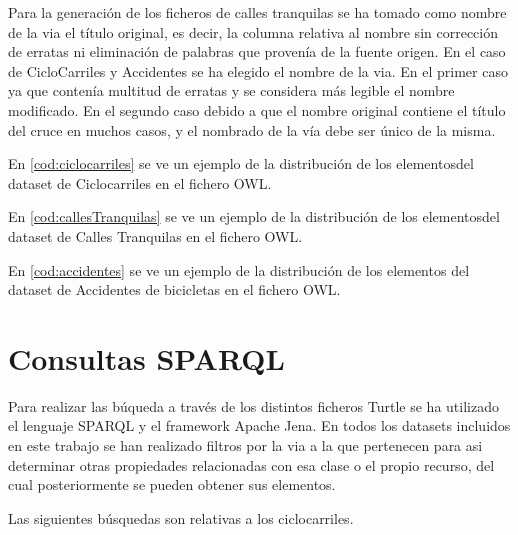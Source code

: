 Para la generación de los ficheros de calles tranquilas se ha tomado como nombre de la via el título original, es decir, la columna relativa al nombre sin corrección de erratas ni eliminación de palabras que provenía de la fuente origen. En el caso de CicloCarriles y Accidentes se ha elegido el nombre de la via. En el primer caso ya que contenía multitud de erratas y se considera más legible el nombre modificado. En el segundo caso debido a que el nombre original contiene el título del cruce en muchos casos, y el nombrado de la vía debe ser único de la misma.

En \ref{cod:ciclocarriles} se ve un ejemplo de la distribución de los elementosdel dataset de Ciclocarriles en el fichero OWL.




En \ref{cod:callesTranquilas} se ve un ejemplo de la distribución de los elementosdel dataset de Calles Tranquilas en el fichero OWL.




En \ref{cod:accidentes} se ve un ejemplo de la distribución de los elementos del dataset de Accidentes de bicicletas en el fichero OWL.









\clearpage
\section{Consultas SPARQL}

Para realizar las búqueda a través de los distintos ficheros Turtle se ha utilizado el lenguaje SPARQL y el framework Apache Jena. En todos los datasets incluidos en este trabajo se han realizado filtros por la via a la que pertenecen para asi determinar otras propiedades relacionadas con esa clase o el propio recurso, del cual posteriormente se pueden obtener sus elementos.


Las siguientes búsquedas son relativas a los ciclocarriles.


